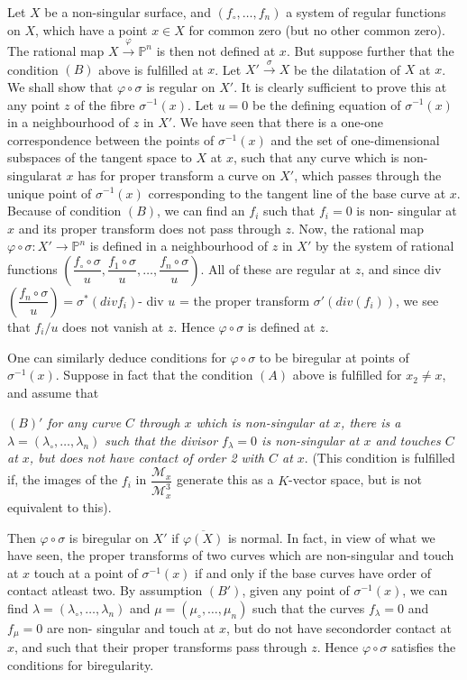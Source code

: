 Let $X$ be a non-singular surface, and $( f_\circ , \ldots , f_n)$ a
system of regular functions on $X$, which have a point $x \in X$ for
common zero (but no other common zero). The rational map $X
\xrightarrow{\varphi}\mathbb{P}^n$ is then not defined at $x$. But
suppose further that the condition $(B)$ above is fulfilled at
$x$. Let $X' \xrightarrow{\sigma} X$ be the dilatation of $X$ at
$x$. We shall show that $\varphi\circ\sigma$ is regular on $X'$. It is
clearly sufficient to prove this at any point $z$ of the fibre
$\sigma^{-1}(x)$. Let $u = 0$ be the defining equation of
$\sigma^{-1}(x)$ in a neighbourhood of $z$ in $X'$. We have seen that
there is a one-one correspondence between the points of
$\sigma^{-1}(x)$ and the set of one-dimensional subspaces of the
tangent space to $X$ at $x$, such that any curve which is non-
singular\pageoriginale at $x$ has for proper transform a curve on
$X'$, which passes 
through the unique point of $\sigma^{-1}(x)$ corresponding to the
tangent line of the base curve at $x$. Because of condition $(B)$, we
can find an $f_i$ such that $f_i = 0$ is non- singular at $x$ and its
proper transform does not pass through $z$. Now, the rational map
$\varphi\circ\sigma: X' \to \mathbb{P}^n$ is defined in a
neighbourhood of $z$ in $X'$ by the system of rational functions
$\left(\dfrac{f_\circ\circ\sigma }{u},\dfrac{f_1\circ\sigma }{u}, \ldots
,\dfrac{f_n\circ\sigma }{u}\right)$. All of these are regular at $z$, and
since div $\left(\dfrac{f_n\circ\sigma }{u}\right)= \sigma^* (div f_i)$- div $u$ =
the proper transform $\sigma '(div(f_i))$, we see that $f_i/u$ does
not vanish at $z$. Hence $\varphi \circ \sigma $ is defined at $z$. 

One can similarly deduce conditions for $\varphi \circ \sigma $  to
be biregular at points of $\sigma^{-1}(x)$. Suppose in fact that the
condition $(A)$ above is fulfilled for $x_2 \neq x$, and assume that  

\noindent
$(B)'$ \textit{for any curve $C$ through $x$ which
  is non-singular at $x$, there is a $\lambda = (\lambda_\circ , \ldots ,
\lambda_n)$ such that the divisor $f_{\lambda}=0$ is
  non-singular at $x$ and touches $C$ at $x$,
but does not have contact of order 2 with $C$
at $x$}. (This condition is fulfilled if, the images of the
$f_i$ in $\dfrac{\mathcal{M}_x}{\mathcal{M}^3_x}$ generate this as a
$K$-vector space, but is not equivalent to this). 

Then $\varphi \circ \sigma $ is biregular on $X'$ if
$\overline{\varphi(X)}$ is normal. In fact, in view of what we have
seen, the proper transforms of two curves which are non-singular and
touch at $x$ touch at a point of $\sigma^{-1}(x)$ if and only if the
base curves have order of contact atleast two. By assumption $(B')$,
given any point of $\sigma^{-1}(x)$, we can find $\lambda= (\lambda_\circ
, \ldots , \lambda_n) $ and $\mu=(\mu_\circ, \ldots , \mu_n)$ such that
the curves $f_{\lambda}=0 $ and  $f_{\mu}=0$ are non- singular and
touch at $x$, but do not have second\pageoriginale order contact at $x$, and such
that their proper transforms pass through $z$. Hence $\varphi \circ
\sigma$ satisfies the conditions for biregularity. 

